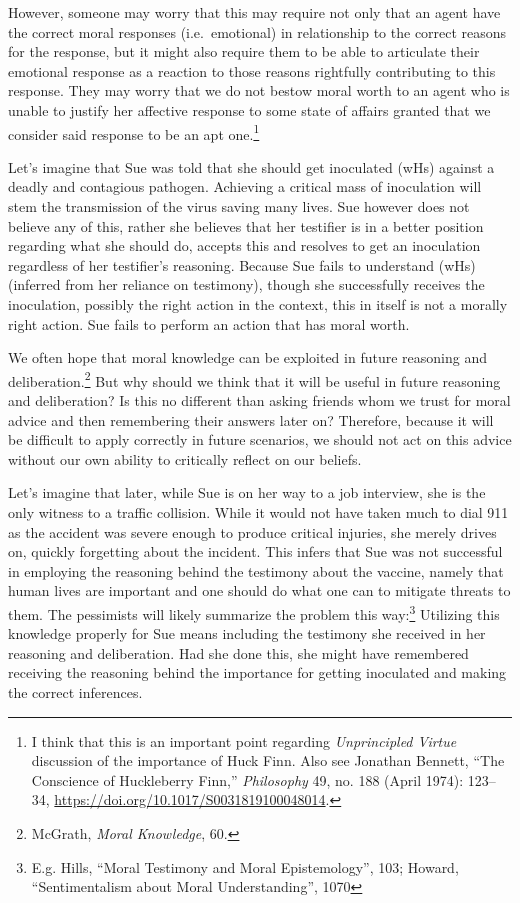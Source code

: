 \documentclass[phdthesis,12pt,final]{wuthesis}
\theoremstyle{definition}
\theoremstyle{definition}
\theoremstyle{definition}
\theoremstyle{definition}
\theoremstyle{remark}
\begin{document}
However, someone may worry that this may require not only that an agent have the correct moral responses (i.e.~emotional) in relationship to the correct reasons for the response, but it might also require them to be able to articulate their emotional response as a reaction to those reasons rightfully contributing to this response. They may worry that we do not bestow moral worth to an agent who is unable to justify her affective response to some state of affairs granted that we consider said response to be an apt one.\footnote{I think that this is an important point regarding \emph{Unprincipled {Virtue}} discussion of the importance of Huck Finn. Also see Jonathan Bennett, {``The {Conscience} of {Huckleberry Finn},''} \emph{Philosophy} 49, no. 188 (April 1974): 123--34, \url{https://doi.org/10.1017/S0031819100048014}.}

Let's imagine that Sue was told that she should get inoculated (wHs) against a deadly and contagious pathogen. Achieving a critical mass of inoculation will stem the transmission of the virus saving many lives. Sue however does not believe any of this, rather she believes that her testifier is in a better position regarding what she should do, accepts this and resolves to get an inoculation regardless of her testifier's reasoning. Because Sue fails to understand (wHs) (inferred from her reliance on testimony), though she successfully receives the inoculation, possibly the right action in the context, this in itself is not a morally right action. Sue fails to perform an action that has moral worth.

We often hope that moral knowledge can be exploited in future reasoning and deliberation.\footnote{McGrath, \emph{Moral {Knowledge}}, 60.} But why should we think that it will be useful in future reasoning and deliberation? Is this no different than asking friends whom we trust for moral advice and then remembering their answers later on? Therefore, because it will be difficult to apply correctly in future scenarios, we should not act on this advice without our own ability to critically reflect on our beliefs.

Let's imagine that later, while Sue is on her way to a job interview, she is the only witness to a traffic collision. While it would not have taken much to dial 911 as the accident was severe enough to produce critical injuries, she merely drives on, quickly forgetting about the incident. This infers that Sue was not successful in employing the reasoning behind the testimony about the vaccine, namely that human lives are important and one should do what one can to mitigate threats to them. The pessimists will likely summarize the problem this way:\footnote{E.g. Hills, {``Moral Testimony and Moral Epistemology''}, 103; Howard, {``Sentimentalism about {Moral Understanding}''}, 1070} Utilizing this knowledge properly for Sue means including the testimony she received in her reasoning and deliberation. Had she done this, she might have remembered receiving the reasoning behind the importance for getting inoculated and making the correct inferences.
\end{document}
